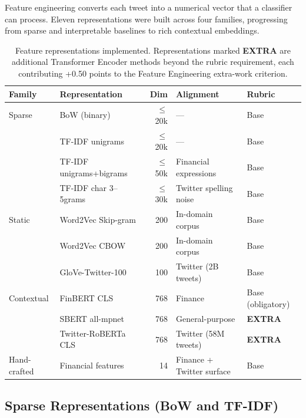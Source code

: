 \documentclass[11pt,a4paper]{article}
\begin{document}
Feature engineering converts each tweet into a numerical vector that a classifier can process.
Eleven representations were built across four families, progressing from sparse and interpretable
baselines to rich contextual embeddings.

\begin{table}[h]
\centering
\small
\begin{tabular}{llrll}
\toprule
\textbf{Family} & \textbf{Representation} & \textbf{Dim} & \textbf{Alignment} & \textbf{Rubric} \\
\midrule
Sparse  & BoW (binary)                  & $\leq$20k & —                        & Base \\
        & TF-IDF unigrams               & $\leq$20k & —                        & Base \\
        & TF-IDF unigrams+bigrams       & $\leq$50k & Financial expressions    & Base \\
        & TF-IDF char 3–5grams          & $\leq$30k & Twitter spelling noise   & Base \\
\midrule
Static  & Word2Vec Skip-gram            & 200       & In-domain corpus         & Base \\
        & Word2Vec CBOW                 & 200       & In-domain corpus         & Base \\
        & GloVe-Twitter-100             & 100       & Twitter (2B tweets)      & Base \\
\midrule
Contextual & FinBERT CLS               & 768       & Finance                  & Base (obligatory) \\
           & SBERT all-mpnet           & 768       & General-purpose          & \textbf{EXTRA} \\
           & Twitter-RoBERTa CLS       & 768       & Twitter (58M tweets)     & \textbf{EXTRA} \\
\midrule
Hand-crafted & Financial features      & 14        & Finance + Twitter surface & Base \\
\bottomrule
\end{tabular}
\caption{Feature representations implemented. Representations marked \textbf{EXTRA} are
additional Transformer Encoder methods beyond the rubric requirement, each contributing
+0.50 points to the Feature Engineering extra-work criterion.}
\label{tab:features}
\end{table}

\subsection{Sparse Representations (BoW and TF-IDF)}
\end{document}

